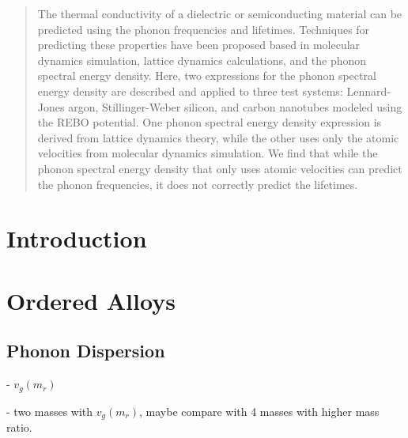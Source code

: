 \documentclass[aps,prl,onecolumn,groupedaddress,amsmath,amssymb,12pt]{revtex4}
\begin{document}
\begin{abstract}
The thermal conductivity of a dielectric or semiconducting material can be predicted using the phonon frequencies and lifetimes. Techniques for predicting these properties have been proposed based in molecular dynamics simulation, lattice dynamics calculations, and the phonon spectral energy density. Here, two expressions for the phonon spectral energy density are described and applied to three test systems: Lennard-Jones argon, Stillinger-Weber silicon, and carbon nanotubes modeled using the REBO potential. One phonon spectral energy density expression is derived from lattice dynamics theory, while the other uses only the atomic velocities from molecular dynamics simulation. We find that while the phonon spectral energy density that only uses atomic velocities can predict the phonon frequencies, it does not correctly predict the lifetimes.
\end{abstract}


\maketitle

\clearpage
\section{\label{S-Motivation}Introduction}




\section{\label{S-Motivation}Ordered Alloys}

\subsection{\label{S-Introduction-OrderedAlloy-PhonoDispersion}Phonon Dispersion}

- $v_g(m_{r})$

- two masses with $v_g(m_{r})$, maybe compare with 4 masses with higher mass ratio.  
\end{document}
